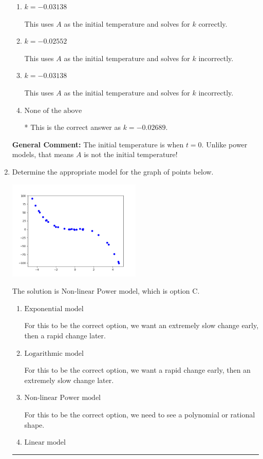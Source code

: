 \documentclass{extbook}[14pt]
\newcommand{\litem}[1]{\item #1

\rule{\textwidth}{0.4pt}}
\begin{document}
\begin{enumerate}
{\begin{enumerate}[label=\Alph*.]
This uses $A$ correctly and solves for $k$ incorrectly.
\item \( k = -0.03138 \)

This uses $A$ as the initial temperature and solves for $k$ correctly.
\item \( k = -0.02552 \)

This uses $A$ as the initial temperature and solves for $k$ incorrectly.
\item \( k = -0.03138 \)

This uses $A$ as the initial temperature and solves for $k$ incorrectly.
\item \( \text{None of the above} \)

* This is the correct answer as $k = -0.02689$.
\end{enumerate}

\textbf{General Comment:} The initial temperature is when $t = 0$. Unlike power models, that means $A$ is not the initial temperature!
}
\litem{
Determine the appropriate model for the graph of points below.

\begin{center}
    \includegraphics[width=0.5\textwidth]{../Figures/identifyModelGraph12B.png}
\end{center}




The solution is \( \text{Non-linear Power model} \), which is option C.\begin{enumerate}[label=\Alph*.]
\item \( \text{Exponential model} \)

For this to be the correct option, we want an extremely slow change early, then a rapid change later.
\item \( \text{Logarithmic model} \)

For this to be the correct option, we want a rapid change early, then an extremely slow change later.
\item \( \text{Non-linear Power model} \)

For this to be the correct option, we need to see a polynomial or rational shape.
\item \( \text{Linear model} \)


\end{enumerate}}
\end{enumerate}
\end{document}
